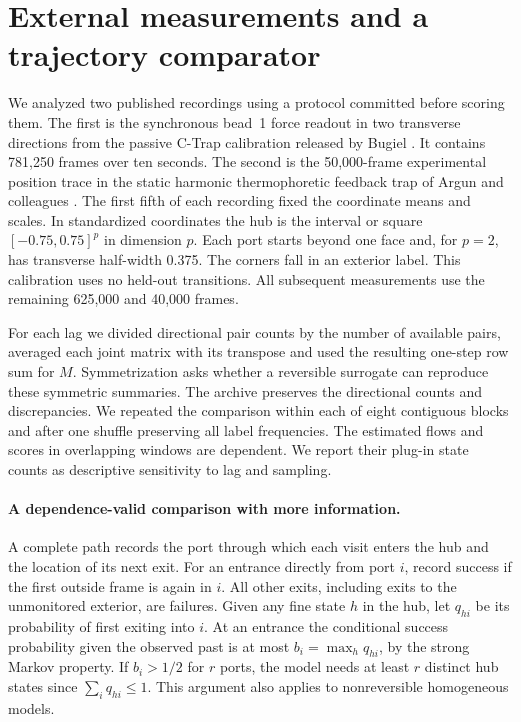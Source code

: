 \section{External measurements and a trajectory comparator}
We analyzed two published recordings using a protocol committed before scoring them. The first is the synchronous bead~1 force readout in two transverse directions from the passive C-Trap calibration released by Bugiel \cite{ctrap}. It contains 781,250 frames over ten seconds. The second is the 50,000-frame experimental position trace in the static harmonic thermophoretic feedback trap of Argun and colleagues \cite{argun}. The first fifth of each recording fixed the coordinate means and scales. In standardized coordinates the hub is the interval or square \([-0.75,0.75]^p\) in dimension \(p\). Each port starts beyond one face and, for \(p=2\), has transverse half-width 0.375. The corners fall in an exterior label. This calibration uses no held-out transitions. All subsequent measurements use the remaining 625,000 and 40,000 frames.

For each lag we divided directional pair counts by the number of available pairs, averaged each joint matrix with its transpose and used the resulting one-step row sum for \(M\). Symmetrization asks whether a reversible surrogate can reproduce these symmetric summaries. The archive preserves the directional counts and discrepancies. We repeated the comparison within each of eight contiguous blocks and after one shuffle preserving all label frequencies. The estimated flows and scores in overlapping windows are dependent. We report their plug-in state counts as descriptive sensitivity to lag and sampling.

\paragraph{A dependence-valid comparison with more information.}
A complete path records the port through which each visit enters the hub and the location of its next exit. For an entrance directly from port \(i\), record success if the first outside frame is again in \(i\). All other exits, including exits to the unmonitored exterior, are failures. Given any fine state \(h\) in the hub, let \(q_{hi}\) be its probability of first exiting into \(i\). At an entrance the conditional success probability given the observed past is at most \(b_i=\max_h q_{hi}\), by the strong Markov property. If \(b_i>1/2\) for \(r\) ports, the model needs at least \(r\) distinct hub states since \(\sum_i q_{hi}\le 1\). This argument also applies to nonreversible homogeneous models.

